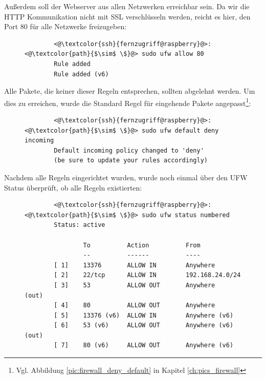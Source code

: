 \documentclass[a4paper, 11pt]{scrartcl}
\begin{document}
Außerdem soll der Webserver aus allen Netzwerken erreichbar sein. Da wir die HTTP Kommunikation nicht mit SSL verschlüsseln werden, reicht es hier, den Port 80
für alle Netzwerke freizugeben:
\begin{figure}[H]
    \begin{mdframed}[backgroundcolor=bbg]
        \begin{lstlisting}
        <@\textcolor{ssh}{fernzugriff@raspberry}@>:<@\textcolor{path}{$\sim$ \$}@> sudo ufw allow 80
        Rule added
        Rule added (v6)
        \end{lstlisting}
    \end{mdframed}
    \label{lst:firewall_allow_http}
\end{figure}

Alle Pakete, die keiner dieser Regeln entsprechen, sollten abgelehnt werden. Um dies zu erreichen, wurde die Standard Regel für eingehende Pakete
angepasst\footnote{Vgl. Abbildung \ref{pic:firewall_deny_default} in Kapitel \ref{ch:pics_firewall}}:
\begin{figure}[H]
    \begin{mdframed}[backgroundcolor=bbg]
        \begin{lstlisting}
        <@\textcolor{ssh}{fernzugriff@raspberry}@>:<@\textcolor{path}{$\sim$ \$}@> sudo ufw default deny incoming
        Default incoming policy changed to 'deny'
        (be sure to update your rules accordingly)
        \end{lstlisting}
    \end{mdframed}
    \label{lst:firewall_default_deny}
\end{figure}
Nachdem alle Regeln eingerichtet wurden, wurde noch einmal über den UFW Status überprüft, ob alle Regeln existierten:
\begin{figure}[H]
    \begin{mdframed}[backgroundcolor=bbg]
        \begin{lstlisting}
        <@\textcolor{ssh}{fernzugriff@raspberry}@>:<@\textcolor{path}{$\sim$ \$}@> sudo ufw status numbered
        Status: active

                To          Action          From
                --          ------          ----
        [ 1]    13376       ALLOW IN        Anywhere
        [ 2]    22/tcp      ALLOW IN        192.168.24.0/24
        [ 3]    53          ALLOW OUT       Anywhere            (out)
        [ 4]    80          ALLOW OUT       Anywhere            
        [ 5]    13376 (v6)  ALLOW IN        Anywhere (v6)
        [ 6]    53 (v6)     ALLOW OUT       Anywhere (v6)       (out)
        [ 7]    80 (v6)     ALLOW OUT       Anywhere (v6)
        \end{lstlisting}
    \end{mdframed}
    \label{lst:firewall_all_rules}
\end{figure}
\end{document}
